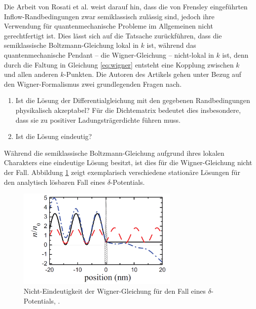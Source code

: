 Die Arbeit von Rosati et al. \cite{failure} weist darauf hin, dass die von Frensley eingeführten Inflow-Randbedingungen zwar semiklassisch zulässig sind, jedoch ihre Verwendung für quantenmechanische Probleme im Allgemeinen nicht gerechtfertigt ist. Dies lässt sich auf die Tatsache zurückführen, dass die semiklassische Boltzmann-Gleichung lokal in $k$ ist, während das quantenmechanische Pendant -- die Wigner-Gleichung -- nicht-lokal in $k$ ist, denn durch die Faltung in Gleichung \eqref{eq:wigner} entsteht eine Kopplung zwischen $k$ und allen anderen $k$-Punkten.
Die Autoren  des Artikels gehen unter Bezug auf den Wigner-Formalismus zwei grundlegenden Fragen nach.
\begin{enumerate}[label=(\roman*)]
  \item Ist die Lösung der Differentialgleichung mit den gegebenen Randbedingungen physikalisch akzeptabel? Für die Dichtematrix bedeutet dies insbesondere, dass sie zu positiver Ladungsträgerdichte führen muss.
  \item Ist die Lösung eindeutig?
\end{enumerate}
Während die semiklassische Boltzmann-Gleichung aufgrund ihres lokalen Charakters eine eindeutige Lösung besitzt, ist dies für die Wigner-Gleichung nicht der Fall. Abbildung \ref{fig:nonuniqueness} zeigt exemplarisch verschiedene stationäre Lösungen für den analytisch lösbaren Fall eines $\delta$-Potentials.
\begin{figure}
  \centering
  \includegraphics[width=0.7\textwidth]{files/nonuniqueness.png}
  \caption{Nicht-Eindeutigkeit der Wigner-Gleichung für den Fall eines $\delta$-Potentials, \cite{failure}.}
  \label{fig:nonuniqueness}
\end{figure}
